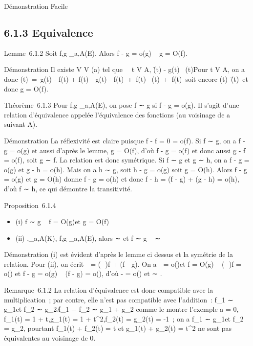 \documentclass[]{article}
\begin{document}
Démonstration Facile

\subsection{6.1.3 Equivalence}

Lemme~6.1.2 Soit f,g _a,A(E). Alors f - g = o(g) \rigtharrow~ g = O(f).

Démonstration Il existe V \in V (a) tel que \forall~~t \in
V \bigcap A, \f(t) - g(t)\
 
\g(t)\. Pour t \in V \bigcap
A, on a donc \g(t)\
=(t) - f(t) + f(t)\
\leq{}(t) - f(t)\
+\ f(t)\ 
\over 2
\g(t)\
+\ f(t)\ soit encore
\g(t)\ \f(t)\, et donc g =
O(f).

Théorème~6.1.3 Pour f,g _a,A(E), on pose f ∼ g si f - g =
o(g). Il s'agit d'une relation d'équivalence appelée l'équivalence des
fonctions (au voisinage de a suivant A).

Démonstration La réflexivité est claire puisque f - f = 0 = o(f). Si f ∼
g, on a f - g = o(g) et aussi d'après le lemme, g = O(f), d'où f - g =
o(f) et donc aussi g - f = o(f), soit g ∼ f. La relation est donc
symétrique. Si f ∼ g et g ∼ h, on a f - g = o(g) et g - h = o(h). Mais
on a h ∼ g, soit h - g = o(g) soit g = O(h). Alors f - g = o(g) et g =
O(h) donne f - g = o(h) et donc f - h = (f - g) + (g - h) = o(h), d'où f
∼ h, ce qui démontre la transitivité.

Proposition~6.1.4

\begin{itemize}
\itemsep1pt\parskip0pt\parsep0pt
\item
  (i) f ∼ g \rigtharrow~ f = O(g)\text et g = O(f)
\item
  (ii) \phi,\psi {}_a,A(K), f,g _a,A(E), alors \phi ∼
  \psi\text et f ∼ g \rigtharrow~ \phif ∼ \psig
\end{itemize}

Démonstration (i) est évident d'après le lemme ci dessus et la symétrie
de la relation. Pour (ii), on écrit \phif - \psig = (\phi - \psi)f + \psi(f - g). On a
\phi - \psi = o(\psi)\text et f = O(g) \rigtharrow~ (\phi - \psi)f = o(\psig) et f
- g = o(g) \rigtharrow~ \psi(f - g) = o(\psig), d'où \phif - \psig = o(\psig) et \phif ∼ \psig.

Remarque~6.1.2 La relation d'équivalence est donc compatible avec la
multiplication~; par contre, elle n'est pas compatible avec l'addition~:
f_1 ∼ g_1\text et f_2 ∼
g_2\rigtharrow~̸f_1 + f_2 ∼ g_1 + g_2
comme le montre l'exemple a = 0, f_1(t) = 1 + t,g_1(t)
= 1 + t^2,f_2(t) = g_2(t) = -1~; on a
f_1 ∼ g_1\text et f_2 =
g_2, pourtant f_1(t) + f_2(t) = t et
g_1(t) + g_2(t) = t^2 ne sont pas
équivalentes au voisinage de 0.
\end{document}
